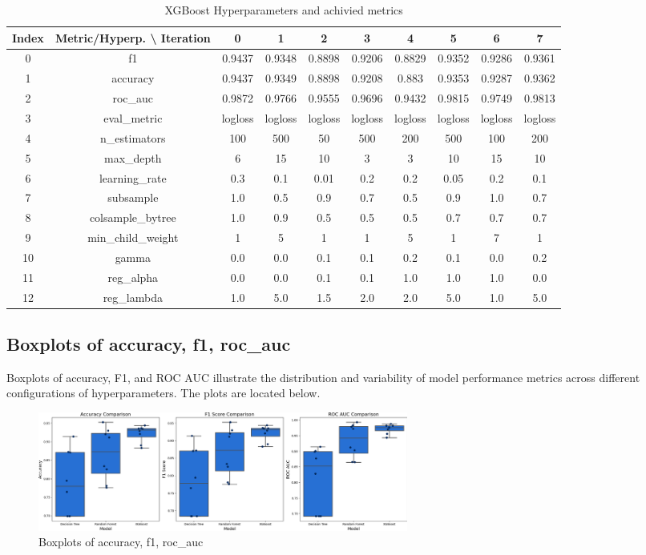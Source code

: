 \documentclass{article}%
\begin{document}
%


\begin{table}[h!]%
\caption{XGBoost Hyperparameters and achivied metrics}%
\vspace{0.2cm}%
\centering%
\begin{tabular}{|c||c||c||c||c||c||c||c||c||c|}%
\hline%
Index&Metric/Hyperp. \textbackslash{} Iteration&0&1&2&3&4&5&6&7\\%
\hline%
0&f1&0.9437&0.9348&0.8898&0.9206&0.8829&0.9352&0.9286&0.9361\\%
1&accuracy&0.9437&0.9349&0.8898&0.9208&0.883&0.9353&0.9287&0.9362\\%
2&roc\_auc&0.9872&0.9766&0.9555&0.9696&0.9432&0.9815&0.9749&0.9813\\%
3&eval\_metric&logloss&logloss&logloss&logloss&logloss&logloss&logloss&logloss\\%
4&n\_estimators&100&500&50&500&200&500&100&200\\%
5&max\_depth&6&15&10&3&3&10&15&10\\%
6&learning\_rate&0.3&0.1&0.01&0.2&0.2&0.05&0.2&0.1\\%
7&subsample&1.0&0.5&0.9&0.7&0.5&0.9&1.0&0.7\\%
8&colsample\_bytree&1.0&0.9&0.5&0.5&0.5&0.7&0.7&0.7\\%
9&min\_child\_weight&1&5&1&1&5&1&7&1\\%
10&gamma&0.0&0.0&0.1&0.1&0.2&0.1&0.0&0.2\\%
11&reg\_alpha&0.0&0.0&0.1&0.1&1.0&1.0&1.0&0.0\\%
12&reg\_lambda&1.0&5.0&1.5&2.0&2.0&5.0&1.0&5.0\\%
\hline%
\end{tabular}%
\end{table}

%
\newpage%
\subsection{Boxplots of accuracy, f1, roc\_auc}%
\label{subsec:Boxplotsofaccuracy,f1,rocauc}%
Boxplots of accuracy, F1, and ROC AUC illustrate the distribution and variability of model performance metrics across different configurations of hyperparameters. The plots are located below.%


\begin{figure}[h!]%
\centering%
\includegraphics[width=460px]{ModelOptimization/box_plots_metrics.png}%
\caption{Boxplots of accuracy, f1, roc\_auc}%
\end{figure}
\end{document}
